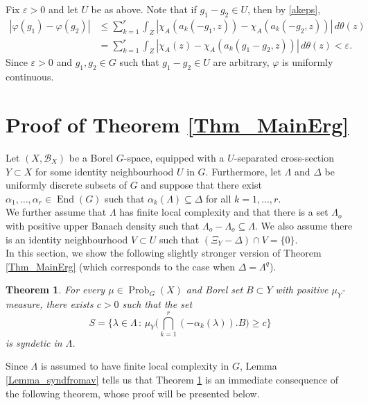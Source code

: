 \documentclass[12pt,reqno,a4paper]{amsart}
\numberwithin{equation}{section}
\newcommand{\eps}{\varepsilon}
\DeclareMathOperator{\End}{End}
\DeclareMathOperator{\Prob}{Prob}
\theoremstyle{theorem}
\newtheorem{theorem}{Theorem}[section]
\theoremstyle{task}
\theoremstyle{definition}
\begin{document}
Fix $\eps > 0$ and let $U$ be as above. Note that if $g_1 - g_2 \in U$, then by \eqref{akeps},
\begin{align*}
|\varphi(g_1) - \varphi(g_2)| 
&\leq \sum_{k=1}^r \int_Z |\chi_A(a_k(-g_1,z)) - \chi_{A}(a_k(-g_2,z)) | \, d\theta(z) \\[0.2cm]
&= 
\sum_{k=1}^r \int_Z |\chi_A(z) - \chi_{A}(a_k(g_1-g_2,z)) | \, d\theta(z)
< \eps.
\end{align*}
Since $\eps > 0$ and $g_1,g_2 \in G$ such that $g_1 - g_2 \in U$ are arbitrary, $\varphi$ is uniformly continuous.

\section{Proof of Theorem \ref{Thm_MainErg}}
\label{sec:prfdyn}

Let $(X,\mathscr{B}_X)$ be a Borel $G$-space, equipped with a $U$-separated  cross-section $Y \subset X$ for some identity neighbourhood $U$ in $G$. Furthermore, 
let $\Lambda$ and $\Delta$ be uniformly discrete subsets of $G$ and suppose that
there exist $\alpha_1,\ldots,\alpha_r \in \End(G)$ such that $\alpha_k(\Lambda) \subseteq \Delta$ for all $k=1,\ldots,r$. \\

We further assume that $\Lambda$ has finite local complexity and that there is a set $\Lambda_o$ with positive upper Banach density such that $\Lambda_o - \Lambda_o \subseteq \Lambda$. We also assume there is an identity neighbourhood $V \subset U$ such that $(\Xi_Y - \Delta) \cap V = \{0\}$. \\

In this section, we show the following slightly stronger version of Theorem \ref{Thm_MainErg} (which corresponds to the case when $\Delta = \Lambda^q$). 

\begin{theorem}
\label{Thm_SyndLevelSet}
For every $\mu \in \Prob_G(X)$ and Borel set $B \subset Y$
with positive $\mu_Y$-measure, there exists $c > 0$ such that the set
\[
S = \Big\{ \lambda \in \Lambda \, : \, \mu_Y\Big( \bigcap_{k=1}^r (-\alpha_k(\lambda)).B\Big) \geq c \Big\}
\]
is syndetic in $\Lambda$.
\end{theorem}

Since $\Lambda$ is assumed to have finite local complexity in $G$, Lemma \ref{Lemma_syndfromav} tells us that Theorem \ref{Thm_SyndLevelSet} is an immediate consequence of the following theorem, whose proof will be presented below.
\end{document}
